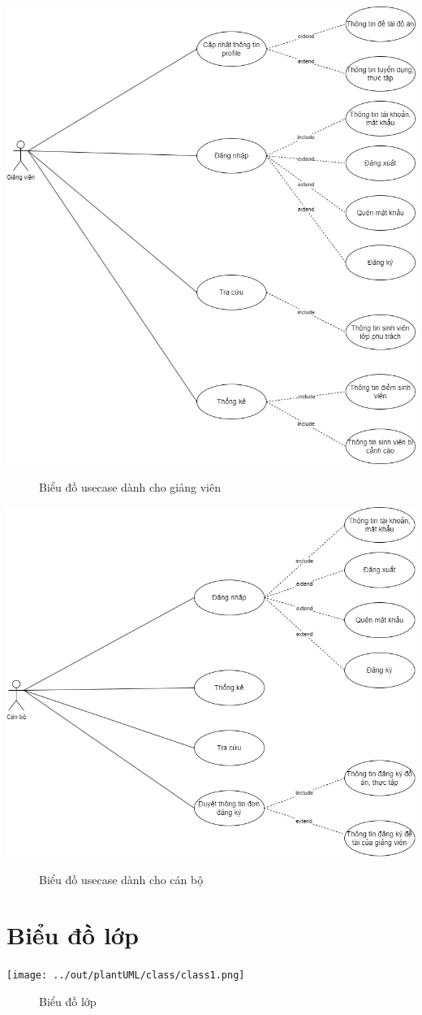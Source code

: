     \begin{center}
      \includegraphics[width=1\textwidth]{../drawio/usecase4.png}
      \begin{figure}[h]
        \centering
        \caption{Biểu đồ usecase dành cho giảng viên}
      \end{figure}
    \end{center}
    \begin{center}
      \includegraphics[width=.9\textwidth]{../drawio/usecase5.png}
      \begin{figure}[h]
        \centering
        \caption{Biểu đồ usecase dành cho cán bộ}
      \end{figure}
    \end{center}

  \section{Biểu đồ lớp}
    \begin{center}
      \texttt{[image: ../out/plantUML/class/class1.png]}
      \begin{figure}[h]
        \centering
        \caption{Biểu đồ lớp}
      \end{figure}
    \end{center}